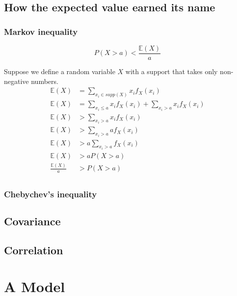 

\subsection{ How the expected value earned its name }
\hspace{1mm}

\subsubsection{Markov inequality}

\begin{equation}
    P(X > a) < \frac{ \mathbb{E}(X) }{a}
\end{equation}

Suppose we define a random variable $X$ with a support that takes only non-negative numbers.
\begin{align}
    \mathbb{E}(X) &= \sum_{ x_{i} \in supp(X)} x_{i} f_{X}(x_{i}) \\ 
    \mathbb{E}(X) &= \sum_{ x_{i} \leq a  } x_{i} f_{X}(x_{i}) + \sum_{ x_{i} > a  } x_{i} f_{X}(x_{i}) \\
    \mathbb{E}(X) &>  \sum_{ x_{i} > a  } x_{i} f_{X}(x_{i}) \\
    \mathbb{E}(X) &>  \sum_{ x_{i} > a  } a f_{X}(x_{i}) \\
    \mathbb{E}(X) &>  a \sum_{ x_{i} > a  } f_{X}(x_{i}) \\
    \mathbb{E}(X) &>  a P(X > a) \\
    \frac{\mathbb{E}(X)}{a} &>  P(X > a) \\
\end{align}



\subsubsection{Chebychev's inequality}



\subsection{Covariance}

\subsection{Correlation}



\section{A Model}


